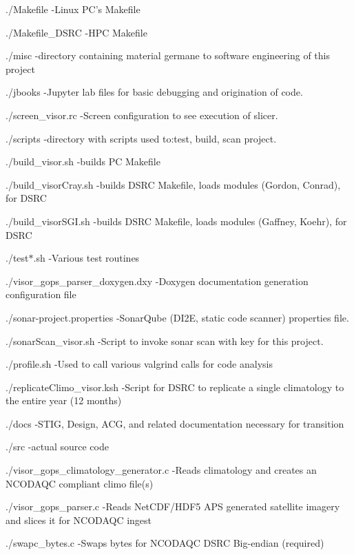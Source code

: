 \begin{DoxyItemize}
\item ./\-Makefile -\/\-Linux P\-C's Makefile
\item ./\-Makefile\-\_\-\-D\-S\-R\-C -\/\-H\-P\-C Makefile
\item ./misc -\/directory containing material germane to software engineering of this project
\item ./jbooks -\/\-Jupyter lab files for basic debugging and origination of code.
\item ./screen\-\_\-visor.rc -\/\-Screen configuration to see execution of slicer.
\item ./scripts -\/directory with scripts used to\-:test, build, scan project.
\item ./build\-\_\-visor.sh -\/builds P\-C Makefile
\item ./build\-\_\-visor\-Cray.sh -\/builds D\-S\-R\-C Makefile, loads modules (Gordon, Conrad), for D\-S\-R\-C
\item ./build\-\_\-visor\-S\-G\-I.sh -\/builds D\-S\-R\-C Makefile, loads modules (Gaffney, Koehr), for D\-S\-R\-C
\item ./test$\ast$.sh -\/\-Various test routines
\item ./visor\-\_\-gops\-\_\-parser\-\_\-doxygen.dxy -\/\-Doxygen documentation generation configuration file
\item ./sonar-\/project.properties -\/\-Sonar\-Qube (D\-I2\-E, static code scanner) properties file.
\item ./sonar\-Scan\-\_\-visor.sh -\/\-Script to invoke sonar scan with key for this project.
\item ./profile.sh -\/\-Used to call various valgrind calls for code analysis
\item ./replicate\-Climo\-\_\-visor.ksh -\/\-Script for D\-S\-R\-C to replicate a single climatology to the entire year (12 months)
\item ./docs -\/\-S\-T\-I\-G, Design, A\-C\-G, and related documentation necessary for transition
\item ./src -\/actual source code
\begin{DoxyItemize}
\item ./visor\-\_\-gops\-\_\-climatology\-\_\-generator.c -\/\-Reads climatology and creates an N\-C\-O\-D\-A\-Q\-C compliant climo file(s)
\item ./visor\-\_\-gops\-\_\-parser.c -\/\-Reads Net\-C\-D\-F/\-H\-D\-F5 A\-P\-S generated satellite imagery and slices it for N\-C\-O\-D\-A\-Q\-C ingest
\item ./swapc\-\_\-bytes.c -\/\-Swaps bytes for N\-C\-O\-D\-A\-Q\-C D\-S\-R\-C Big-\/endian (required)

\end{DoxyItemize}
\end{DoxyItemize}
